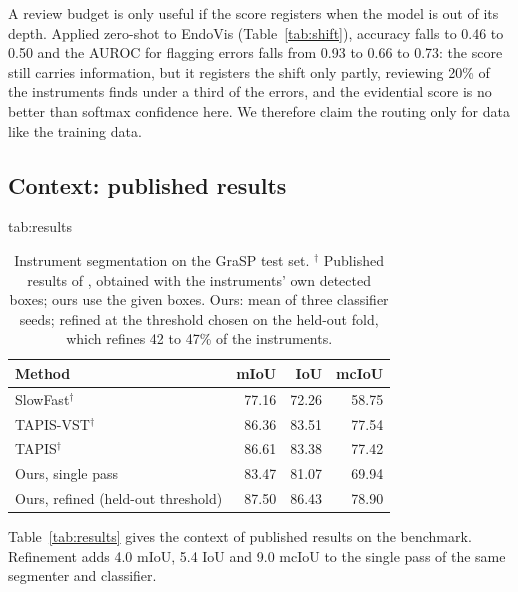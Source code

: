 A review budget is only useful if the score registers when the model is out of its depth.
Applied zero-shot to EndoVis (Table~\ref{tab:shift}), accuracy falls to 0.46 to 0.50 and the AUROC for flagging errors falls from 0.93 to 0.66 to 0.73: the score still carries information, but it registers the shift only partly, reviewing 20\% of the instruments finds under a third of the errors, and the evidential score is no better than softmax confidence here.
We therefore claim the routing only for data like the training data.

\subsection{Context: published results}
\label{sec:context}
\begin{table}[ht!]
\floatconts
  {tab:results}
  {\caption{Instrument segmentation on the GraSP test set. $^\dagger$ Published results of \citet{ayobi2024pixel}, obtained with the instruments' own detected boxes; ours use the given boxes. Ours: mean of three classifier seeds; refined at the threshold chosen on the held-out fold, which refines 42 to 47\% of the instruments. }}
  {\small\begin{tabular}{lrrr}
  \toprule
  \bfseries Method & \bfseries mIoU & \bfseries IoU & \bfseries mcIoU\\
  \midrule
  SlowFast$^\dagger$ & 77.16 & 72.26 & 58.75\\
  TAPIS-VST$^\dagger$ & 86.36 & 83.51 & 77.54\\
  TAPIS$^\dagger$ & 86.61 & 83.38 & 77.42\\
  \midrule
  Ours, single pass & 83.47 & 81.07 & 69.94\\
  Ours, refined (held-out threshold) & 87.50 & 86.43 & 78.90\\
  \bottomrule
  \end{tabular}}
\end{table}

Table~\ref{tab:results} gives the context of published results on the benchmark.
Refinement adds 4.0 mIoU, 5.4 IoU and 9.0 mcIoU to the single pass of the same segmenter and classifier.

